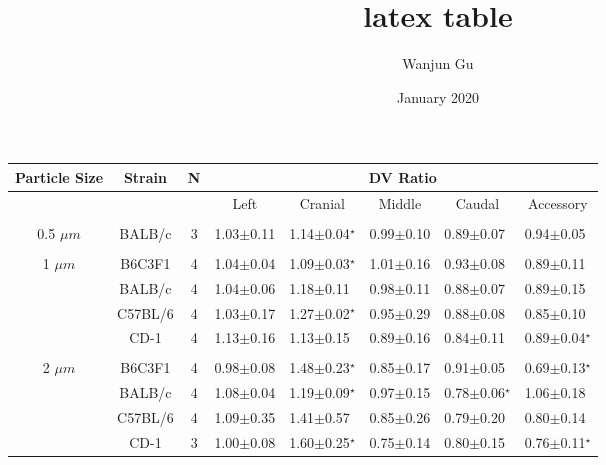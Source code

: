 \documentclass{article}
\title{latex table}
\author{Wanjun Gu}
\date{January 2020}
\begin{document}
\begin{table}[]
\begin{tabular}{@{}ccclllll@{}}
\toprule
Particle Size & Strain  & N & \multicolumn{5}{c}{DV Ratio}                                                                                                                     \\ \midrule
              &         &   & \multicolumn{1}{c}{Left} & \multicolumn{1}{c}{Cranial} & \multicolumn{1}{c}{Middle} & \multicolumn{1}{c}{Caudal} & \multicolumn{1}{c}{Accessory} \\ \cmidrule(l){4-8} 
              &         &   & \multicolumn{1}{c}{}     & \multicolumn{1}{c}{}        & \multicolumn{1}{c}{}       & \multicolumn{1}{c}{}       & \multicolumn{1}{c}{}          \\
0.5 $\mu m$   & BALB/c  & 3 & 1.03$\pm$0.11            & 1.14$\pm$0.04$^\star$       & 0.99$\pm$0.10              & 0.89$\pm$0.07              & 0.94$\pm$0.05                 \\
              &         &   & \multicolumn{1}{c}{}     & \multicolumn{1}{c}{}        & \multicolumn{1}{c}{}       & \multicolumn{1}{c}{}       & \multicolumn{1}{c}{}          \\
1 $\mu m$     & B6C3F1  & 4 & 1.04$\pm$0.04            & 1.09$\pm$0.03$^\star$       & 1.01$\pm$0.16              & 0.93$\pm$0.08              & 0.89$\pm$0.11                 \\
              & BALB/c  & 4 & 1.04$\pm$0.06            & 1.18$\pm$0.11               & 0.98$\pm$0.11              & 0.88$\pm$0.07              & 0.89$\pm$0.15                 \\
              & C57BL/6 & 4 & 1.03$\pm$0.17            & 1.27$\pm$0.02$^\star$       & 0.95$\pm$0.29              & 0.88$\pm$0.08              & 0.85$\pm$0.10                 \\
              & CD-1    & 4 & 1.13$\pm$0.16            & 1.13$\pm$0.15               & 0.89$\pm$0.16              & 0.84$\pm$0.11              & 0.89$\pm$0.04$^\star$         \\
              &         &   & \multicolumn{1}{c}{}     & \multicolumn{1}{c}{}        & \multicolumn{1}{c}{}       & \multicolumn{1}{c}{}       & \multicolumn{1}{c}{}          \\
2 $\mu m$     & B6C3F1  & 4 & 0.98$\pm$0.08            & 1.48$\pm$0.23$^\star$       & 0.85$\pm$0.17              & 0.91$\pm$0.05              & 0.69$\pm$0.13$^\star$         \\
              & BALB/c  & 4 & 1.08$\pm$0.04            & 1.19$\pm$0.09$^\star$       & 0.97$\pm$0.15              & 0.78$\pm$0.06$^\star$      & 1.06$\pm$0.18                 \\
              & C57BL/6 & 4 & 1.09$\pm$0.35            & 1.41$\pm$0.57               & 0.85$\pm$0.26              & 0.79$\pm$0.20              & 0.80$\pm$0.14                 \\
              & CD-1    & 3 & 1.00$\pm$0.08            & 1.60$\pm$0.25$^\star$       & 0.75$\pm$0.14              & 0.80$\pm$0.15              & 0.76$\pm$0.11$^\star$         \\ \bottomrule
\end{tabular}
\end{table}
\end{document}
